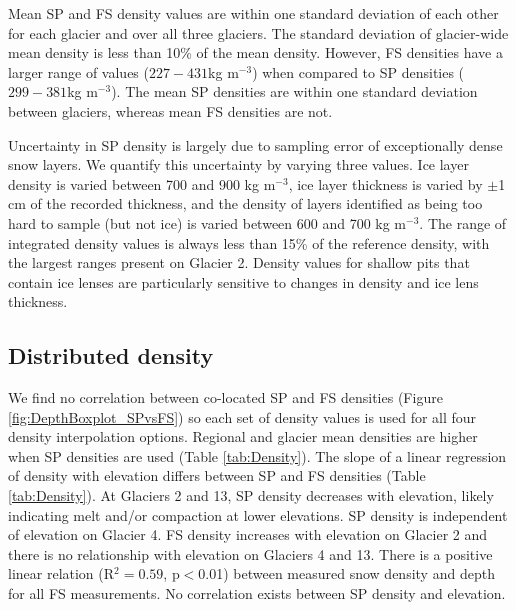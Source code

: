 \documentclass[twocolumn, letterpaper]{igs}
\begin{document}
Mean SP and FS density values are within one standard deviation of each other for each glacier and over all three glaciers. The standard deviation of glacier-wide mean density is less than 10\% of the mean density. However, FS densities have a larger range of values ($227-431$kg m$^{-3}$) when compared to SP densities ($299-381$kg m$^{-3}$).  The mean SP densities are within one standard deviation between glaciers, whereas mean FS densities are not.

Uncertainty in SP density is largely due to sampling error of exceptionally dense snow layers. We quantify this uncertainty by varying three values. Ice layer density is varied between 700 and 900 kg m$^{-3}$, ice layer thickness is varied by $\pm$1 cm of the recorded thickness, and the density of layers identified as being too hard to sample (but not ice) is varied between 600 and 700 kg m$^{-3}$. The range of integrated density values is always less than 15\% of the reference density, with the largest ranges present on Glacier 2. Density values for shallow pits that contain ice lenses are particularly sensitive to changes in density and ice lens thickness.

\subsection{Distributed density}

We find no correlation between co-located SP and FS densities (Figure \ref{fig:DepthBoxplot_SPvsFS}) so each set of density values is used for all four density interpolation options. Regional and glacier mean densities are higher when SP densities are used (Table \ref{tab:Density}). The slope of a linear regression of density with elevation differs between SP and FS densities (Table \ref{tab:Density}). At Glaciers 2 and 13, SP density decreases with elevation, likely indicating melt and/or compaction at lower elevations. SP density is independent of elevation on Glacier 4. FS density increases with elevation on Glacier 2 and there is no relationship with elevation on Glaciers 4 and 13. There is a positive linear relation (R$^2= 0.59$, p$<$0.01) between measured snow density and depth for all FS measurements. No correlation exists between SP density and elevation.
\end{document}
